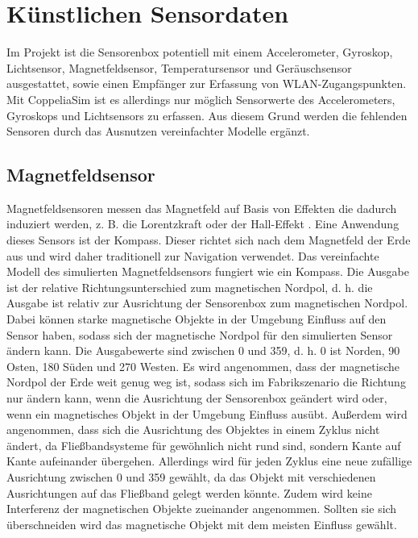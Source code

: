 \section{Künstlichen Sensordaten}
Im Projekt ist die Sensorenbox potentiell mit einem Accelerometer, Gyroskop, Lichtsensor, Magnetfeldsensor,
Temperatursensor und Geräuschsensor ausgestattet, sowie einen Empfänger zur Erfassung von WLAN-Zugangspunkten.
Mit CoppeliaSim ist es allerdings nur möglich Sensorwerte des Accelerometers, Gyroskops und Lichtsensors zu erfassen.
Aus diesem Grund werden die fehlenden Sensoren durch das Ausnutzen vereinfachter Modelle ergänzt.

\subsection{Magnetfeldsensor}
Magnetfeldsensoren messen das Magnetfeld auf Basis von Effekten die dadurch induziert werden, z. B. die Lorentzkraft oder der Hall-Effekt \cite{thompsonMEMS}.
Eine Anwendung dieses Sensors ist der Kompass.
Dieser richtet sich nach dem Magnetfeld der Erde aus und wird daher traditionell zur Navigation verwendet.
\newline
\newline
Das vereinfachte Modell des simulierten Magnetfeldsensors fungiert wie ein Kompass.
Die Ausgabe ist der relative Richtungsunterschied zum magnetischen Nordpol,
d. h. die Ausgabe ist relativ zur Ausrichtung der Sensorenbox zum magnetischen Nordpol.
Dabei können starke magnetische Objekte in der Umgebung Einfluss auf den Sensor haben,
sodass sich der magnetische Nordpol für den simulierten Sensor ändern kann.
Die Ausgabewerte sind zwischen 0 und 359, d. h. 0 ist Norden, 90 Osten, 180 Süden und 270 Westen.
\newline
\newline
Es wird angenommen, dass der magnetische Nordpol der Erde weit genug weg ist,
sodass sich im Fabrikszenario die Richtung nur ändern kann, wenn die Ausrichtung der Sensorenbox geändert wird
oder, wenn ein magnetisches Objekt in der Umgebung Einfluss ausübt.
Außerdem wird angenommen, dass sich die Ausrichtung des Objektes in einem Zyklus nicht ändert,
da Fließbandsysteme für gewöhnlich nicht rund sind, sondern Kante auf Kante aufeinander übergehen.
Allerdings wird für jeden Zyklus eine neue zufällige Ausrichtung zwischen 0 und 359 gewählt,
da das Objekt mit verschiedenen Ausrichtungen auf das Fließband gelegt werden könnte.
Zudem wird keine Interferenz der magnetischen Objekte zueinander angenommen.
Sollten sie sich überschneiden wird das magnetische Objekt mit dem meisten Einfluss gewählt.

